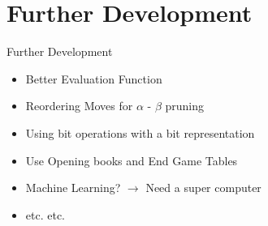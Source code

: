 \documentclass{beamer}
\begin{document}
\section{Further Development}

\begin{frame}{Further Development}
  \begin{itemize}
    \item Better Evaluation Function
    \item Reordering Moves for $\alpha$ - $\beta$ pruning
    \item Using bit operations with a bit representation
    \item Use Opening books and End Game Tables
    \item Machine Learning? $\rightarrow$ Need a super computer
    \item etc. etc.
  \end{itemize}
\end{frame}
\end{document}
